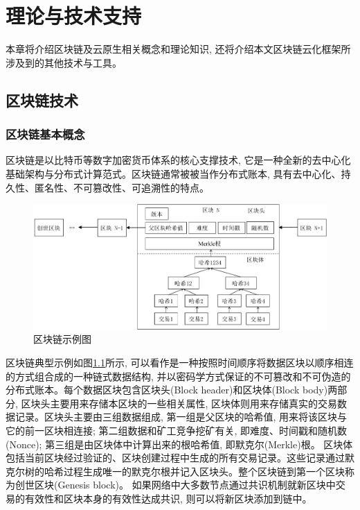 \chapter{理论与技术支持}

本章将介绍区块链及云原生相关概念和理论知识, 还将介绍本文区块链云化框架所涉及到的其他技术与工具。

\section{区块链技术}\label{section: blockchain}

\subsection{区块链基本概念}
区块链是以比特币等数字加密货币体系的核心支撑技术, 它是一种全新的去中心化基础架构与分布式计算范式\cite{1016383}。区块链通常被被当作分布式账本, 具有去中心化、持久性、匿名性、不可篡改性、可追溯性的特点。

\begin{figure}[h] %
    \centering %
    \includegraphics[width=1\textwidth]{FIGs/chapter2/blockchain_example.pdf} %
    \caption{区块链示例图} %
    \label{blockchain_example} %
\end{figure}%

区块链典型示例如图\ref{blockchain_example}所示, 可以看作是一种按照时间顺序将数据区块以顺序相连的方式组合成的一种链式数据结构, 并以密码学方式保证的不可篡改和不可伪造的分布式账本。每个数据区块包含区块头(Block header)和区块体(Block body)两部分, 区块头主要用来存储本区块的一些相关属性, 区块体则用来存储真实的交易数据记录。区块头主要由三组数据组成, 第一组是父区块的哈希值, 用来将该区块与它的前一区块相连接; 第二组数据和矿工竞争挖矿有关, 即难度、时间戳和随机数(Nonce); 第三组是由区块体中计算出来的根哈希值, 即默克尔(Merkle)根。
区块体包括当前区块经过验证的、区块创建过程中生成的所有交易记录。这些记录通过默克尔树的哈希过程生成唯一的默克尔根并记入区块头。整个区块链到第一个区块称为创世区块(Genesis block)。
如果网络中大多数节点通过共识机制就新区块中交易的有效性和区块本身的有效性达成共识, 则可以将新区块添加到链中。

